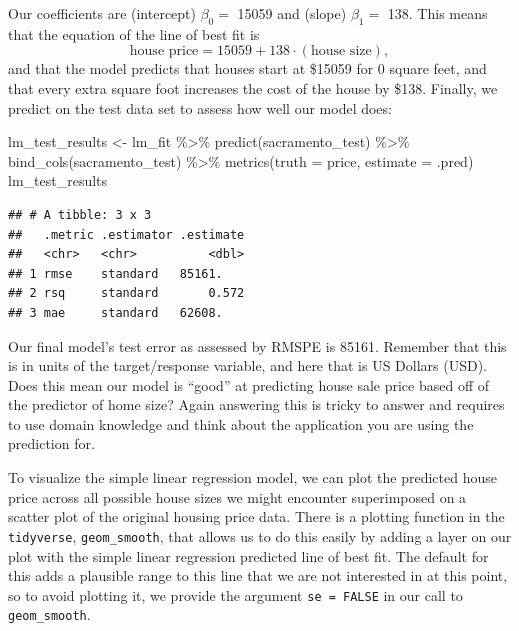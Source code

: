 \documentclass[
]{krantz}
\makeatletter
\newenvironment{Shaded}{\begin{snugshade}}{\end{snugshade}}
\newcommand{\AttributeTok}[1]{\textcolor[rgb]{0.61,0.61,0.61}{#1}}
\newcommand{\FunctionTok}[1]{\textcolor[rgb]{0,0,0}{#1}}
\newcommand{\NormalTok}[1]{#1}
\newcommand{\OtherTok}[1]{\textcolor[rgb]{0.37,0.37,0.37}{#1}}
\newcommand{\SpecialCharTok}[1]{\textcolor[rgb]{0,0,0}{#1}}
\newenvironment{kframe}{%
\medskip{}
\setlength{\fboxsep}{.8em}
 \def\at@end@of@kframe{}%
 \ifinner\ifhmode%
  \def\at@end@of@kframe{\end{minipage}}%
  \begin{minipage}{\columnwidth}%
 \fi\fi%
 \def\FrameCommand##1{\hskip\@totalleftmargin \hskip-\fboxsep
 \colorbox{shadecolor}{##1}\hskip-\fboxsep
     \hskip-\linewidth \hskip-\@totalleftmargin \hskip\columnwidth}%
 \MakeFramed {\advance\hsize-\width
   \@totalleftmargin\z@ \linewidth\hsize
   \@setminipage}}%
 {\par\unskip\endMakeFramed%
 \at@end@of@kframe}
\renewenvironment{Shaded}{\begin{kframe}}{\end{kframe}}
\makeatother
\begin{document}
Our coefficients are
(intercept) \(\beta_0=\) 15059
and (slope) \(\beta_1=\) 138.
This means that the equation of the line of best fit is
\[\text{house price} = 15059 + 138\cdot (\text{house size}),\]
and that the model predicts that houses
start at \$15059 for 0 square feet, and that
every extra square foot increases the cost of the house by \$138. Finally, we predict on the test data set to assess how well our model does:

\begin{Shaded}
\begin{Highlighting}[]
\NormalTok{lm\_test\_results }\OtherTok{\textless{}{-}}\NormalTok{ lm\_fit }\SpecialCharTok{\%\textgreater{}\%}
  \FunctionTok{predict}\NormalTok{(sacramento\_test) }\SpecialCharTok{\%\textgreater{}\%}
  \FunctionTok{bind\_cols}\NormalTok{(sacramento\_test) }\SpecialCharTok{\%\textgreater{}\%}
  \FunctionTok{metrics}\NormalTok{(}\AttributeTok{truth =}\NormalTok{ price, }\AttributeTok{estimate =}\NormalTok{ .pred)}
\NormalTok{lm\_test\_results}
\end{Highlighting}
\end{Shaded}

\begin{verbatim}
## # A tibble: 3 x 3
##   .metric .estimator .estimate
##   <chr>   <chr>          <dbl>
## 1 rmse    standard   85161.   
## 2 rsq     standard       0.572
## 3 mae     standard   62608.
\end{verbatim}

Our final model's test error as assessed by RMSPE
is 85161.
Remember that this is in units of the target/response variable, and here that
is US Dollars (USD). Does this mean our model is ``good'' at predicting house
sale price based off of the predictor of home size? Again answering this is
tricky to answer and requires to use domain knowledge and think about the
application you are using the prediction for.

To visualize the simple linear regression model, we can plot the predicted house
price across all possible house sizes we might encounter superimposed on a scatter
plot of the original housing price data. There is a plotting function in
the \texttt{tidyverse}, \texttt{geom\_smooth}, that
allows us to do this easily by adding a layer on our plot with the simple
linear regression predicted line of best fit. The default for this adds a
plausible range to this line that we are not interested in at this point, so to
avoid plotting it, we provide the argument \texttt{se\ =\ FALSE} in our call to
\texttt{geom\_smooth}.
\end{document}
